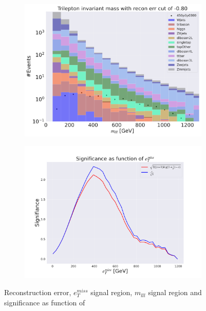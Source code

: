 \begin{figure}[H]
    \hfill
    \begin{subfigure}{.40\textwidth}
        \includegraphics[width=\textwidth]{Figures/VAE_testing/small/3lep/b_data_recon_big_rm3_feats_sig_450p0p0300_mlll_recon_errcut_-0.80.pdf}
        \caption{}
        \label{fig:VAE_3lep_small_mlll_450_2}
    \end{subfigure}
    \hfill   
    \begin{subfigure}{.40\textwidth}
        \includegraphics[width=\textwidth]{Figures/VAE_testing/small/3lep/significance_etmiss_450p0p0300_-0.7957779204248656.pdf}
        \caption{}
        \label{fig:VAE_3lep_small_signi_450_2}
    \end{subfigure}
    \hfill      
    \caption[3lep shallow network | $450p300$ | VAE | 2]{Reconstruction error, $e_T^{miss}$ signal region, $m_{lll}$ signal region and significance as function of 
}
\end{figure}
